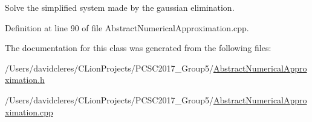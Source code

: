 Solve the simplified system made by the gaussian elimination. 



Definition at line 90 of file Abstract\+Numerical\+Approximation.\+cpp.



The documentation for this class was generated from the following files\+:\begin{DoxyCompactItemize}
\item 
/\+Users/davidcleres/\+C\+Lion\+Projects/\+P\+C\+S\+C2017\+\_\+\+Group5/\mbox{\hyperlink{_abstract_numerical_approximation_8h}{Abstract\+Numerical\+Approximation.\+h}}\item 
/\+Users/davidcleres/\+C\+Lion\+Projects/\+P\+C\+S\+C2017\+\_\+\+Group5/\mbox{\hyperlink{_abstract_numerical_approximation_8cpp}{Abstract\+Numerical\+Approximation.\+cpp}}\end{DoxyCompactItemize}
